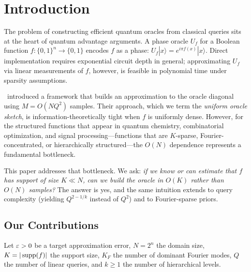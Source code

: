 \section{Introduction}
\label{sec:introduction}

The problem of constructing efficient quantum oracles from classical queries sits at the heart of quantum advantage arguments.  A phase oracle $U_f$ for a Boolean function $f:\{0,1\}^n\to\{0,1\}$ encodes $f$ as a phase: $U_f|x\rangle = e^{i\pi f(x)}|x\rangle$.  Direct implementation requires exponential circuit depth in general; approximating $U_f$ via linear measurements of $f$, however, is feasible in polynomial time under sparsity assumptions.

\Zhao\ introduced a framework that builds an approximation to the oracle diagonal using $M = O(NQ^2)$ samples.  Their approach, which we term the \emph{uniform oracle sketch}, is information-theoretically tight when $f$ is uniformly dense.  However, for the structured functions that appear in quantum chemistry, combinatorial optimization, and signal processing---functions that are $K$-sparse, Fourier-concentrated, or hierarchically structured---the $O(N)$ dependence represents a fundamental bottleneck.

This paper addresses that bottleneck.  We ask: \emph{if we know or can estimate that $f$ has support of size $K \ll N$, can we build the oracle in $O(K)$ rather than $O(N)$ samples?}  The answer is yes, and the same intuition extends to query complexity (yielding $Q^{2-1/k}$ instead of $Q^2$) and to Fourier-sparse priors.

\subsection{Our Contributions}

Let $\varepsilon > 0$ be a target approximation error, $N = 2^n$ the domain size, $K = |\operatorname{supp}(f)|$ the support size, $K_F$ the number of dominant Fourier modes, $Q$ the number of linear queries, and $k \geq 1$ the number of hierarchical levels.

